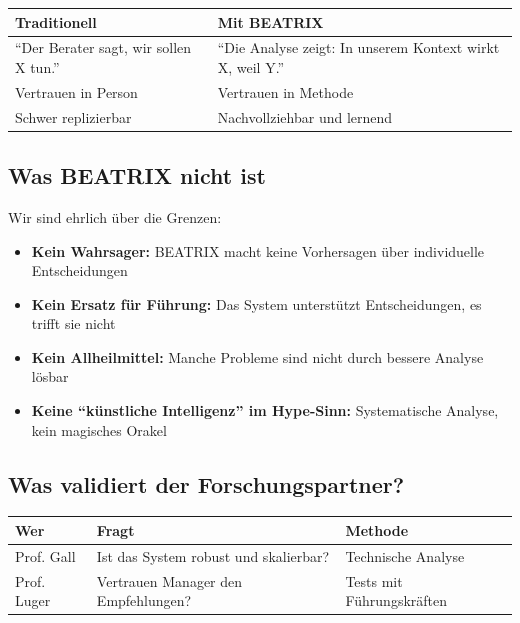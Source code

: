 \documentclass[11pt,a4paper]{article}
\begin{document}
\begin{table}[h]
\centering
\begin{tabular}{@{}L{6cm}L{7cm}@{}}
\toprule
\textbf{Traditionell} & \textbf{Mit BEATRIX} \\
\midrule
``Der Berater sagt, wir sollen X tun.'' & ``Die Analyse zeigt: In unserem Kontext wirkt X, weil Y.'' \\
Vertrauen in Person & Vertrauen in Methode \\
Schwer replizierbar & Nachvollziehbar und lernend \\
\bottomrule
\end{tabular}
\end{table}

\subsection{Was BEATRIX nicht ist}

Wir sind ehrlich über die Grenzen:

\begin{itemize}
    \item \textbf{Kein Wahrsager:} BEATRIX macht keine Vorhersagen über individuelle Entscheidungen
    \item \textbf{Kein Ersatz für Führung:} Das System unterstützt Entscheidungen, es trifft sie nicht
    \item \textbf{Kein Allheilmittel:} Manche Probleme sind nicht durch bessere Analyse lösbar
    \item \textbf{Keine ``künstliche Intelligenz'' im Hype-Sinn:} Systematische Analyse, kein magisches Orakel
\end{itemize}

\subsection{Was validiert der Forschungspartner?}

\begin{table}[h]
\centering
\begin{tabular}{@{}L{3cm}L{5cm}L{5cm}@{}}
\toprule
\textbf{Wer} & \textbf{Fragt} & \textbf{Methode} \\
\midrule
Prof. Gall & Ist das System robust und skalierbar? & Technische Analyse \\
Prof. Luger & Vertrauen Manager den Empfehlungen? & Tests mit Führungskräften \\
\bottomrule
\end{tabular}
\end{table}
\end{document}

